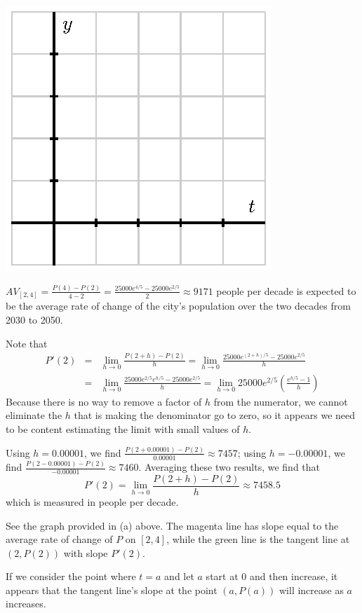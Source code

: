 \begin{activitySolution}
\ba
	\item 	\includegraphics{figures/1_3_Act3.eps}
	\item $AV_{[2,4]} = \frac{P(4)-P(2)}{4-2} = \frac{25000e^{4/5} - 25000e^{2/5}}{2} \approx 9171$ people per decade is expected to be the average rate of change of the city's population over the two decades from 2030 to 2050.
	\item Note that
	\begin{eqnarray*} P'(2) & = & \lim_{h \to 0} \frac{P(2+h)-P(2)}{h} = \lim_{h \to 0} \frac{25000 e^{(2+h)/5}-25000e^{2/5}}{h} \\
	                                 & = &  \lim_{h \to 0} \frac{25000 e^{2/5} e^{h/5} -25000e^{2/5}}{h} =  \lim_{h \to 0} 25000e^{2/5}\left( \frac{e^{h/5} - 1}{h}\right)	\end{eqnarray*}
Because there is no way to remove a factor of $h$ from the numerator, we cannot eliminate the $h$ that is making the denominator go to zero, so it appears we need to be content estimating the limit with small values of $h$.
	\item Using $h = 0.00001$, we find $\frac{P(2+0.00001)-P(2)}{0.00001} \approx 7457$; using $h = -0.00001$, we find $\frac{P(2-0.00001)-P(2)}{-0.00001} \approx 7460$.  Averaging these two results, we find that
	$$P'(2) =  \lim_{h \to 0} \frac{P(2+h)-P(2)}{h} \approx 7458.5$$
	which is measured in people per decade.
	\item See the graph provided in (a) above.  The magenta line has slope equal to the average rate of change of $P$ on $[2,4]$, while the green line is the tangent line at $(2,P(2))$ with slope $P'(2)$.
	\item If we consider the point where $t = a$ and let $a$ start at 0 and then increase, it appears that the tangent line's slope at the point $(a,P(a))$ will increase as $a$ increases.
\ea
\end{activitySolution}
\aftera